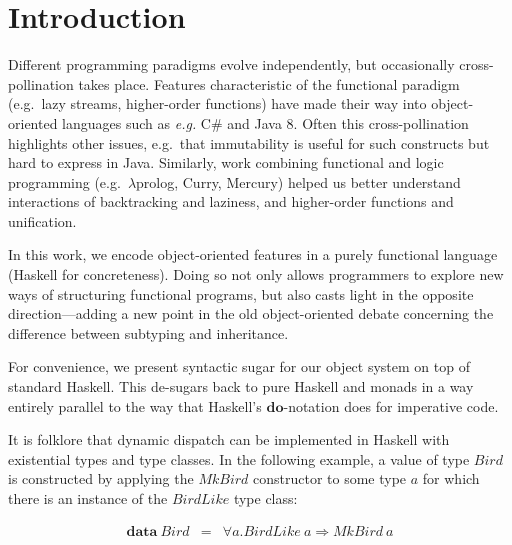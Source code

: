 \documentclass[runningheads,a4paper]{llncs}
\newcommand{\todo}[1]{[{\color{blue}#1}]}
\begin{document}
\section{Introduction}
\label{sec:introduction}

Different programming paradigms evolve independently, but occasionally cross-pollination takes place. Features characteristic of the functional paradigm (e.g.\ lazy streams, higher-order functions) have made their way into object-oriented languages such as \emph{e.g.} C\# and Java 8. Often this cross-pollination highlights other issues, e.g.\ that immutability is useful for such constructs but hard to express in Java. Similarly, work combining functional and logic programming
(e.g.\ $\lambda$prolog, Curry, Mercury) helped us better understand interactions of backtracking and laziness, and higher-order functions and unification.

In this work, we encode object-oriented features in a purely functional language
(Haskell for concreteness).  Doing so not only allows programmers to
explore new ways of structuring functional programs,
but also casts light in the opposite
direction---adding a new point in the old object-oriented debate
concerning the difference between subtyping and inheritance.

For convenience, we present syntactic sugar for our object system on top of standard Haskell. This de-sugars back to pure Haskell and monads in a way entirely
parallel to the way that Haskell's $\mathbf{do}$-notation does for imperative code.


It is folklore that dynamic dispatch can be implemented in Haskell with existential types and type classes. In the following example, a value of type $\mathit{Bird}$ is constructed by applying the $\mathit{MkBird}$ constructor to some type $a$ for which there is an instance of the $\mathit{BirdLike}$ type class:

\begin{displaymath}
\begin{array}{lcl}
\mathbf{data}~\mathit{Bird} & = & \forall a. \mathit{BirdLike}~a \Rightarrow \mathit{MkBird}~a
\end{array}
\end{displaymath}
\end{document}
